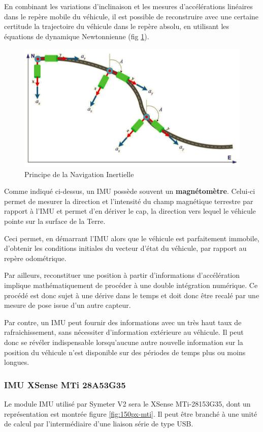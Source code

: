 \documentclass[12pt,a4paper]{report}
\begin{document}
		\para En combinant les variations d'inclinaison et les mesures d'accélérations linéaires dans le repère mobile du véhicule, il est possible de reconstruire avec une certaine certitude la trajectoire du véhicule dans le repère absolu, en utilisant les équations de dynamique Newtonnienne (fig \ref{fig:navinertial}).
		
		\begin{figure}[h!]
			\centering
			\includegraphics[width=0.7\linewidth]{img/navinertial}
			\caption[Navigation Inertielle]{Principe de la Navigation Inertielle}
			\label{fig:navinertial}
		\end{figure}
		
		
		\para Comme indiqué ci-dessus, un IMU possède souvent un \textbf{magnétomètre}. Celui-ci permet de mesurer la direction et l'intensité du champ magnétique terrestre par rapport à l'IMU et permet d'en dériver le cap, la direction vers lequel le véhicule pointe sur la surface de la Terre. 
		
		\para Ceci permet, en démarrant l'IMU alors que le véhicule est parfaitement immobile, d'obtenir les conditions initiales du vecteur d'état du véhicule, par rapport au repère odométrique.
		
		\para Par ailleurs, reconstituer une position à partir d'informations d'accélération implique mathématiquement de procéder à une double intégration numérique. Ce procédé est donc sujet à une dérive dans le temps et doit donc être recalé par une mesure de pose issue d'un autre capteur.
		
		\para Par contre, un IMU peut fournir des informations avec un très haut taux de rafraichissement, sans nécessiter d'information extérieure au véhicule. Il peut donc se révéler indispensable lorsqu'aucune autre nouvelle information sur la position du véhicule n'est disponible sur des périodes de temps plus ou moins longues.
		
		\subsubsection{IMU XSense MTi 28A53G35}
		Le module IMU utilisé par Symeter V2 sera le XSense MTi-28153G35, dont un représentation est montrée figure \ref{fig:150px-mti}. Il peut être branché à une unité de calcul par l'intermédiaire d'une liaison série de type USB.
		
\end{document}
